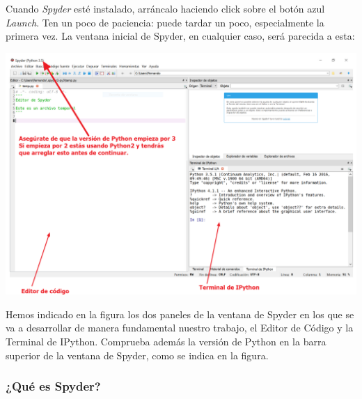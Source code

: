 \documentclass[10pt,a4paper]{article}\usepackage[]{graphicx}\usepackage[]{color}
\begin{document}
Cuando {\em Spyder} esté instalado, arráncalo haciendo click sobre el botón azul {\em Launch}. Ten un poco de paciencia: puede tardar un poco, especialmente la primera vez. La ventana inicial de Spyder, en cualquier caso, será parecida a esta:

\begin{center}
\includegraphics[width=14.5cm]{../fig/Tut-00-py-17-Spyder.png}\\[1cm]
\end{center}

Hemos indicado en la figura los dos paneles de la ventana de Spyder en los que se va a desarrollar de manera fundamental nuestro trabajo, el {\sf Editor de Código} y la {\sf Terminal de IPython}. Comprueba además la versión de Python en la barra superior de la ventana de Spyder, como se indica en la figura.

\subsubsection*{¿Qué es Spyder?}
\end{document}
